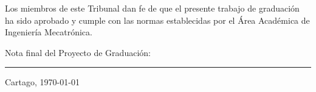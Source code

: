 \vfill

Los miembros de este Tribunal dan fe de que el presente trabajo de graduación
ha sido aprobado y cumple con las normas establecidas por el Área Académica de
Ingeniería Mecatrónica.

\vfill

\begin{center}
  Nota final del Proyecto de Graduación: \rule{3cm}{0.5pt}
\end{center}
\vfill

\begin{center}
  Cartago, \today \par
\end{center}

\cleardoublepage

